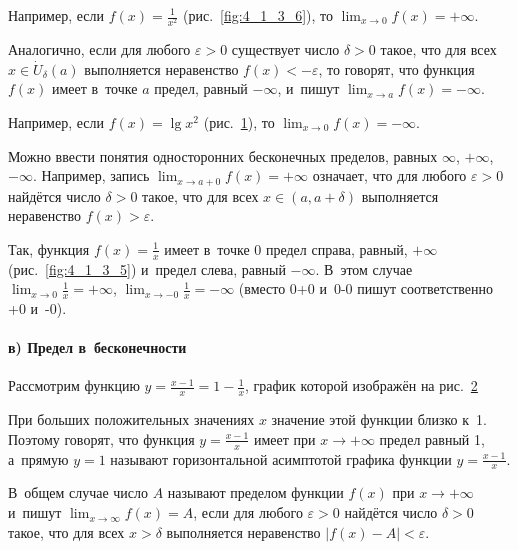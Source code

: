 Например, если $\displaystyle f(x) = \frac{1}{x^{2}}$ (рис.\ \ref{fig:4_1_3_6}),
то $\displaystyle \lim_{x \to 0} f(x) = +\infty$.

Аналогично, если для любого $\varepsilon > 0$ существует число $\delta > 0$ такое,
что для всех $x \in \dot U_{\delta}(a)$ выполняется неравенство
$f(x) < -\varepsilon$, то говорят, что функция $f(x)$ имеет в~точке $a$ предел,
равный $-\infty$, и~пишут $\displaystyle \lim_{x \to a} f(x) = -\infty$.

Например, если $f(x) = \lg x^{2}$ (рис.\ \ref{fig:4_1_3_7}),
то $\displaystyle \lim_{x \to 0} f(x) = -\infty$.

\begin{figure}\label{fig:4_1_3_7}
\end{figure}

Можно ввести понятия односторонних бесконечных пределов,
равных $\infty$, $+\infty$, $-\infty$.
Например, запись $\displaystyle \lim_{x \to a+0} f(x) = +\infty$ означает,
что для любого $\varepsilon > 0$ найдётся число $\delta > 0$ такое,
что для всех $x \in (a, a + \delta)$ выполняется неравенство $f(x) > \varepsilon$.

Так, функция $\displaystyle f(x) = \frac{1}{x}$ имеет в~точке 0 предел справа,
равный, $+\infty$ (рис.\ \ref{fig:4_1_3_5}) и~предел слева, равный $-\infty$.
В~этом случае $\displaystyle \lim_{x \to 0} \frac{1}{x} = +\infty$,
$\displaystyle \lim_{x \to -0}\frac{1}{x} = -\infty$
(вместо 0+0 и~0-0 пишут соответственно +0 и~-0).

\paragraph{в) Предел в~бесконечности}\label{sec:4_1_3_c}
Рассмотрим функцию $\displaystyle y = \frac{x-1}{x} = 1 - \frac{1}{x}$,
график которой изображён на рис.\ \ref{fig:4_1_3_8}

\begin{figure}\label{fig:4_1_3_8}
\end{figure}

\noindent
При больших положительных значениях $x$ значение этой функции близко к~1.
Поэтому говорят, что функция $\displaystyle y = \frac{x-1}{x}$ имеет
при $x \to +\infty$ предел равный 1, а~прямую $y = 1$ называют
горизонтальной асимптотой графика функции $\displaystyle y = \frac{x-1}{x}$.

В~общем случае число $A$ называют пределом функции $f(x)$ при $x \to +\infty$
и~пишут $\displaystyle \lim_{x \to \infty} f(x) = A$, если для любого
$\varepsilon > 0$ найдётся число $\delta > 0$ такое, что для всех $x > \delta$
выполняется неравенство $\left| f(x) - A \right| < \varepsilon$.

